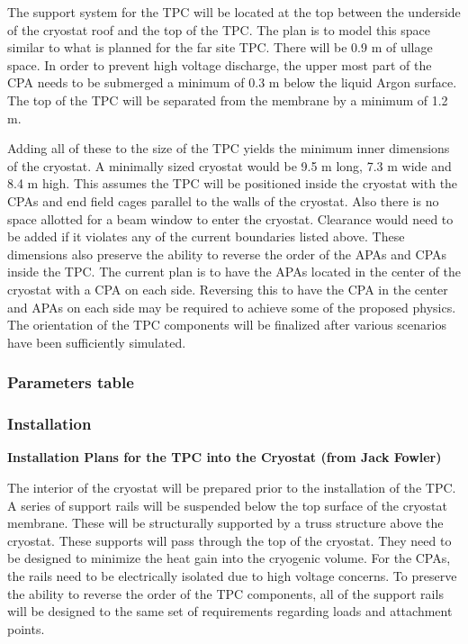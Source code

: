 The support system for the TPC will be located at the top between the underside of the cryostat roof and  the top of the TPC.  The plan is to model this space similar to what is planned for the far site TPC.  There will be 0.9 m of ullage space.  In order to prevent high voltage discharge, the upper most part of the CPA needs to be submerged a minimum of 0.3 m below the liquid Argon surface.  The top of the TPC will be separated from the membrane by a minimum of 1.2 m.  

Adding all of these to the size of the TPC yields the minimum inner dimensions of the cryostat.  A minimally sized cryostat would be 9.5 m long, 7.3 m wide and 8.4 m high.  This assumes the TPC will be positioned inside the cryostat with the CPAs and end field cages parallel to the walls of the cryostat.  Also there is no space allotted for a beam window to enter the cryostat.  Clearance would need to be added if it violates any of the current boundaries listed above.  
These dimensions also preserve the ability to reverse the order of the APAs and CPAs inside the TPC.  The current plan is to have the APAs located in the center of the cryostat with a CPA on each side.  Reversing this to have the CPA in the center and APAs on each side may be required to achieve some of the proposed physics.  The orientation of the TPC components will be finalized after various scenarios have been sufficiently simulated.  



\subsubsection{Parameters table}

\subsubsection{Installation}

\textbf{Installation Plans for the TPC into the Cryostat  (from Jack Fowler)}

The interior of the cryostat will be prepared prior to the installation of the TPC.  A series of support rails 
will be suspended below the top surface of the cryostat membrane.  These will be structurally supported 
by a truss structure above the cryostat.  These supports will pass through the top of the cryostat.  They 
need to be designed to minimize the heat gain into the cryogenic volume.  For the CPAs, the rails need to 
be electrically isolated due to high voltage concerns.  To preserve the ability to reverse the order of the 
TPC components, all of the support rails will be designed to the same set of requirements regarding 
loads and attachment points.  

